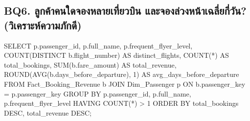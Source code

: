 \documentclass[11pt]{article}
\begin{document}
\subsection*{BQ6. ลูกค้าคนใดจองหลายเที่ยวบิน และจองล่วงหน้าเฉลี่ยกี่วัน? (วิเคราะห์ความภักดี)}
\begin{sql}
SELECT p.passenger_id, p.full_name, p.frequent_flyer_level,
       COUNT(DISTINCT b.flight_number) AS distinct_flights,
       COUNT(*) AS total_bookings,
       SUM(b.fare_amount) AS total_revenue,
       ROUND(AVG(b.days_before_departure), 1) AS avg_days_before_departure
FROM Fact_Booking_Revenue b
JOIN Dim_Passenger p ON b.passenger_key = p.passenger_key
GROUP BY p.passenger_id, p.full_name, p.frequent_flyer_level
HAVING COUNT(*) > 1
ORDER BY total_bookings DESC, total_revenue DESC;
\end{sql}
\end{document}
